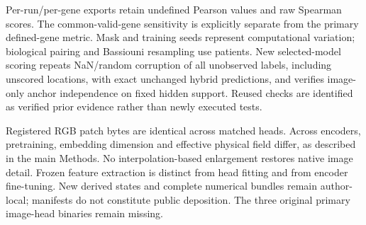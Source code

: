 Per-run/per-gene exports retain undefined Pearson values and raw Spearman scores. The common-valid-gene sensitivity is explicitly separate from the primary defined-gene metric. Mask and training seeds represent computational variation; biological pairing and Bassiouni resampling use patients. New selected-model scoring repeats NaN/random corruption of all unobserved labels, including unscored locations, with exact unchanged hybrid predictions, and verifies image-only anchor independence on fixed hidden support. Reused checks are identified as verified prior evidence rather than newly executed tests.

Registered RGB patch bytes are identical across matched heads. Across encoders, pretraining, embedding dimension and effective physical field differ, as described in the main Methods. No interpolation-based enlargement restores native image detail. Frozen feature extraction is distinct from head fitting and from encoder fine-tuning. New derived states and complete numerical bundles remain author-local; manifests do not constitute public deposition. The three original primary image-head binaries remain missing.


\FloatBarrier

